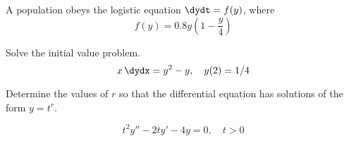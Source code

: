 \documentclass[12pt]{exam}
\begin{document}
    


\newpage

\begin{questions}




    \newpage
    \question[10] A population obeys the logistic equation $\displaystyle \dydt = f(y)$, where $$f(y) = 0.8y\left(1 - \frac{y}{4}\right)$$ %

\newpage 

\question[6] Solve the initial value problem. $$x \, \dydx = y^2 - y, \quad y(2) = 1/4$$

 \vspace{8cm}
 
\newpage 

\question[4] Determine the values of $r$ so that the differential equation has solutions of the form $y=t^r$. 

$$t^2y'' - 2ty' - 4y =0, \quad t>0$$ 


\end{questions}
\end{document}
